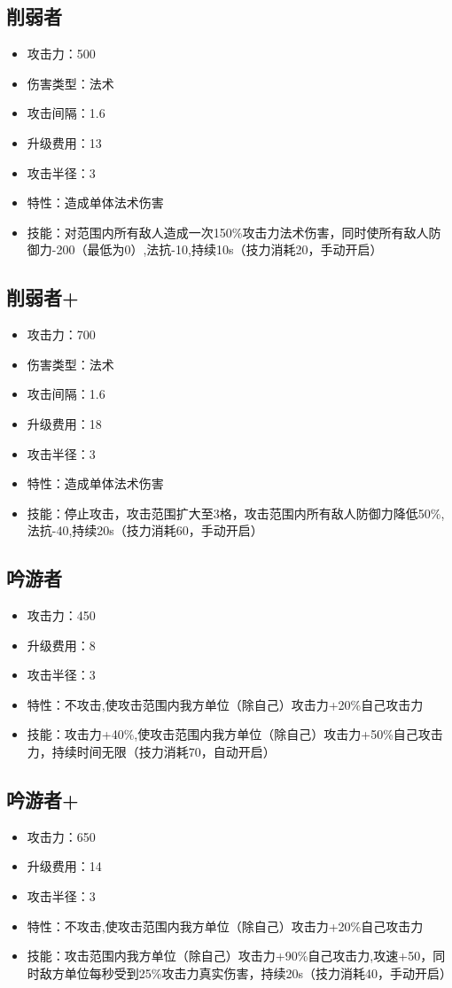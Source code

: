 \documentclass[a4paper,12pt]{article}
\begin{document}
		\subsection{削弱者}
			\begin{itemize}
				\item 攻击力：500
				\item 伤害类型：法术
				\item 攻击间隔：1.6
				\item 升级费用：13
				\item 攻击半径：3
				\item 特性：造成单体法术伤害
				\item 技能：对范围内所有敌人造成一次150\%攻击力法术伤害，同时使所有敌人防御力-200（最低为0）,法抗-10,持续10s（技力消耗20，手动开启）
			\end{itemize}
		\subsection{削弱者+}
			\begin{itemize}
				\item 攻击力：700
				\item 伤害类型：法术
				\item 攻击间隔：1.6
				\item 升级费用：18
				\item 攻击半径：3
				\item 特性：造成单体法术伤害
				\item 技能：停止攻击，攻击范围扩大至3格，攻击范围内所有敌人防御力降低50\%,法抗-40,持续20s（技力消耗60，手动开启）
			\end{itemize}	
		\subsection{吟游者}
			\begin{itemize}
				\item 攻击力：450
				\item 升级费用：8
				\item 攻击半径：3
				\item 特性：不攻击,使攻击范围内我方单位（除自己）攻击力+20\%自己攻击力
				\item 技能：攻击力+40\%,使攻击范围内我方单位（除自己）攻击力+50\%自己攻击力，持续时间无限（技力消耗70，自动开启）
			\end{itemize}
		\subsection{吟游者+}
			\begin{itemize}
				\item 攻击力：650
				\item 升级费用：14
				\item 攻击半径：3
				\item 特性：不攻击,使攻击范围内我方单位（除自己）攻击力+20\%自己攻击力
				\item 技能：攻击范围内我方单位（除自己）攻击力+90\%自己攻击力,攻速+50，同时敌方单位每秒受到25\%攻击力真实伤害，持续20s（技力消耗40，手动开启）
			\end{itemize}	
\end{document}
